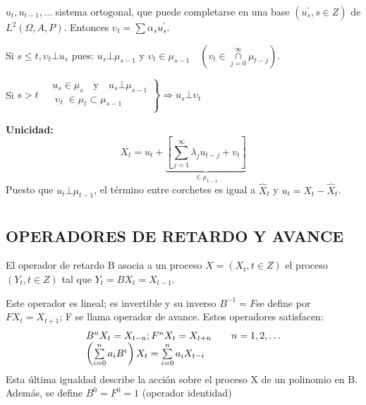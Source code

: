 $u_{t}, u_{t-1},\ldots$ sistema ortogonal, que puede completarse en una base $\left(u_{s}^{'}, s\in Z \right)$ de $L^{2}\left(\Omega, A, P \right)$. Entonces $\upsilon_{t} =\sum\alpha_{s} u_{s}^{'}$.\newline

Si $s\leq t, \upsilon_{t} \bot u_{s}$ pues: $u_{s} \bot \mu_{s-1}$ y $\upsilon_{t} \in \mu_{s-1} \quad \left(v_{t} \in \mathop \cap \limits_{j=0}^{\infty } \mu_{t-j} \right)$.\newline

Si $s>t \quad \left. \begin{array}{l}
u_{s} \in \mu_{s}\quad \text{y}\quad u_{s} \bot \mu_{s-1} \\ 
\mathop \mathop \upsilon_{t} \in \mu_{t} \subset \mu_{s-1} \\ 
\end{array} \right\} \Rightarrow u_{s} \bot \upsilon_{t}$\newline

\textbf{Unicidad:}
\[
X_{t} =u_{t} +\underbrace {\left[\sum_{j=1}^{\infty} \lambda_{j} u_{t-j} +v_{t} \right]}_{\in \mu_{t-1}}
\]
Puesto que $u_{t} \bot \mu_{t-1}$, el t\'{e}rmino entre corchetes es igual a $\hat{X}_{t}$ y $u_{t} =X_{t} -\hat{X}_{t}$.



\chapter{}
\section{OPERADORES DE RETARDO Y AVANCE}
El operador de retardo B asocia a un proceso $X=\left(X_{t}, t\in Z \right)$ el proceso $\left(Y_{t}, t\in Z \right)$ tal que $Y_{t} =BX_{t} =X_{t-1}$.\newline

Este operador es lineal; es invertible y su inverso $B^{-1}=F$se define por$FX_{t} =X_{t+1} $; F se llama operador de avance. Estos operadores satisfacen:
\[
\begin{array}{l}
 B^{n}X_{t} =X_{t-n};F^{n}X_{t} =X_{t+n} \quad \quad 
n=1,2,\mathellipsis \\ 
 \left( {\sum\limits_{i=0}^n {a_{i} B^{i}} } \right)X_{t} 
=\sum\limits_{i=0}^n {a_{i} X_{t-i} } \\ 
 \end{array}
\]
Esta \'{u}ltima igualdad describe la acci\'{o}n sobre el proceso X de un polinomio en B. Adem\'{a}s, se define $B^{0}=F^{0}=1$ (operador identidad)\newline

